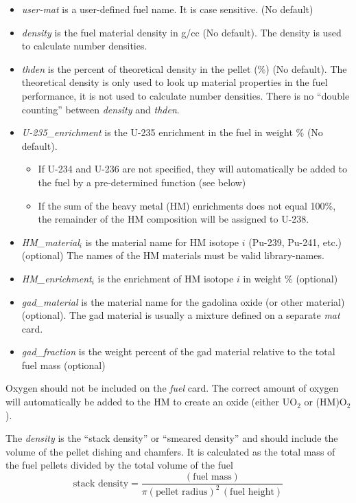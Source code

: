 \begin{itemize}   %
  \item {\it user-mat} is a user-defined fuel name. It is case sensitive. (No default)
  \item {\it density} is the fuel material density in g/cc (No default).
     The density is used to calculate number densities.
  \item {\it thden} is the percent of theoretical density in the pellet (\%) (No default).
   The theoretical density is only used to look up material properties in the fuel performance,
   it is not used to calculate number densities.  There is no ``double counting'' between
   {\it density} and {\it thden}.
  \item {\it U-235\_enrichment} is the U-235 enrichment in the fuel in weight \%  (No default).
  \begin{itemize}   %
    \item If U-234 and U-236 are not specified, they will automatically be added to the
       fuel by a pre-determined function (see below)
    \item If the sum of the heavy metal (HM) enrichments does not equal 100\%, the remainder of the
        HM composition will be assigned to U-238.
  \end{itemize}
  \item {\it HM\_material$_i$} is the material name for HM isotope $i$ (Pu-239, Pu-241, etc.) (optional) 
    The names of the HM materials must be valid library-names.
  \item {\it HM\_enrichment$_i$} is the enrichment of HM isotope $i$ in weight \% (optional)
  \item {\it gad\_material} is the material name for the gadolina oxide (or other material) (optional).
        The gad material is usually a mixture defined on a separate {\it mat} card.
  \item {\it gad\_fraction} is the weight percent of the gad material relative to the total fuel mass (optional)
\end{itemize}

Oxygen should not be included on the {\it fuel} card.  The correct amount of oxygen will automatically
be added to the HM to create an oxide (either UO$_2$  or (HM)O$_2$).

The {\it density} is the ``stack density'' or ``smeared density'' and should include the volume
of the pellet dishing and chamfers.
It is calculated as the total mass of the fuel pellets divided by the total volume of the fuel
\begin{equation}
  \mbox{stack density} = \frac{ (\mbox{fuel mass})} { \pi (\mbox{pellet radius})^2 \, (\mbox{fuel height}) }
\end{equation}

